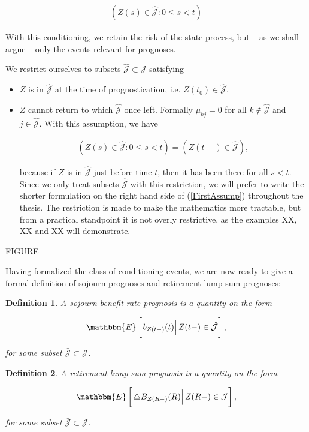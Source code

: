 \documentclass{book}
\newcommand{\1}[1]{\mathbbm{1}_{\left\lbrace #1 \right\rbrace}}
\newcommand{\econd}[2][def]{\mathbbm{E} \left[ \left. #1 \right| #2 \right]}
\theoremstyle{break}
\newtheorem{definition}{Definition}%
\theoremstyle{remark}
\numberwithin{equation}{section}
\begin{document}
\begin{align} \label{FirstCond}
	\left( Z(s) \in \hat{\mathcal{J}} : 0 \leq s < t \right)
\end{align}

With this conditioning, we retain the risk of the state process, but -- as we shall argue -- only the events relevant for prognoses.

We restrict ourselves to subsets $\hat{\mathcal{J}} \subset \mathcal{J}$ satisfying

\begin{itemize}
	\item $Z$ is in $\hat{\mathcal{J}}$ at the time of prognostication, i.e. $Z(t_0) \in \hat{\mathcal{J}}$.
	\item $Z$ cannot return to which $\hat{\mathcal{J}}$ once left. Formally $\mu_{kj} = 0$ for all $k \notin \hat{\mathcal{J}}$ and $j \in \hat{\mathcal{J}}$. With this assumption, we have
	
	\begin{align} \label{FirstAssump}
		\left( Z(s) \in \hat{\mathcal{J}} : 0 \leq s < t \right) = \left( Z(t-) \in \hat{\mathcal{J}} \right),
	\end{align}
	
	because if $Z$ is in $\hat{\mathcal{J}}$ just before time $t$, then it has been there for all $s < t$. Since we only treat subsets $\hat{\mathcal{J}}$ with this restriction, we will prefer to write the shorter formulation on the right hand side of (\ref{FirstAssump}) throughout the thesis. The restriction is made to make the mathematics more tractable, but from a practical standpoint it is not overly restrictive, as the examples XX, XX and XX will demonstrate. 
\end{itemize}


FIGURE

Having formalized the class of conditioning events, we are now ready to give a formal definition of sojourn prognoses and retirement lump sum prognoses:

\begin{definition}
	A sojourn benefit rate prognosis is a quantity on the form
	
	\begin{gather*}
		\econd[b_{Z(t-)}(t)]{Z(t-) \in \hat{\mathcal{J}}},
	\end{gather*}
	
	for some subset $\bar{\mathcal{J}} \subset \mathcal{J}$.
\end{definition}

\begin{definition}
	A retirement lump sum prognosis is a quantity on the form
	
	\begin{gather*}
		\econd[\triangle B_{Z(R-)}(R)]{Z(R-) \in \bar{\mathcal{J}}},
	\end{gather*}
	
	for some subset $\bar{\mathcal{J}} \subset \mathcal{J}$.
\end{definition}
\end{document}
